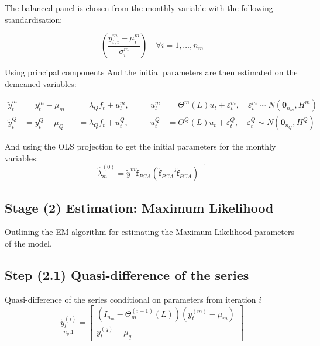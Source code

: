 \documentclass[12pt]{article}
\begin{document}
\begin{appendices}
The balanced panel is chosen from the monthly variable with the following standardisation:

\begin{equation*}
\left(\frac{y_{t,i}^{m} - \mu_{i}^{m}}{\sigma_{i}^{m}}\right) \quad \forall i=1,\dots,n_{m}
\end{equation*}

Using principal components
And the initial parameters are then estimated on the demeaned variables:

\begin{equation}
\begin{aligned}
\tilde{y}_{t}^{m}  	&= y_{t}^{m} - \mu_{m} &&= \lambda_{Q} f_{t} + u_{t}^{m}, \quad &&u_{t}^{m} &= \Theta^{m}(L)u_{t} + \varepsilon_{t}^{m},\quad \varepsilon_{t}^{m}\sim N(\textbf{0}_{n_{m}}, H^{m}) \\
\tilde{y}_{t}^{Q}	&= y_{t}^{Q} - \mu_{Q} &&= \lambda_{Q} f_{t} + u_{t}^{Q}, \quad &&u_{t}^{Q} &= \Theta^{Q}(L)u_{t} + \varepsilon_{t}^{Q},\quad \varepsilon_{t}^{Q} \sim N(\textbf{0}_{n_{Q}}, H^{Q})
\end{aligned}
\end{equation}

And using the OLS projection to get the initial parameters for the monthly variables:
\begin{equation*}
\widehat{\lambda}_{m}^{(0)} = \widetilde{y}^{m} \widehat{\textbf{f}}_{PCA} \left(\widehat{\textbf{f}}_{PCA}'\widehat{\textbf{f}}_{PCA}\right)^{-1}
\end{equation*}

\subsection{Stage (2) Estimation: Maximum Likelihood}

Outlining the EM-algorithm for estimating the Maximum Likelihood parameters of the model.

\subsection{Step (2.1) Quasi-difference of the series}
Quasi-difference of the series conditional on parameters from iteration $i$
\begin{equation*}
\underset{n_{y}.1}{\widetilde{y}_{t}^{(i)}} =
\begin{bmatrix}
\left(I_{n_{m}} - \Theta_{m}^{(i-1)}(L)\right)\left(y_{t}^{(m)} - \mu_{m}\right)\\
y_{t}^{(q)} - \mu_{q}
\end{bmatrix}
\end{equation*}


\end{appendices}
\end{document}
